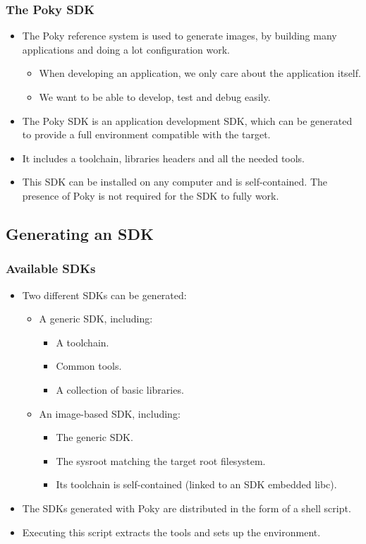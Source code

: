 \begin{frame}
  \frametitle{The Poky SDK}
  \begin{itemize}
    \item The Poky reference system is used to generate images, by
      building many applications and doing a lot configuration work.
      \begin{itemize}
        \item When developing an application, we only care about the
          application itself.
        \item We want to be able to develop, test and debug easily.
      \end{itemize}
    \item The Poky SDK is an application development SDK, which can be
      generated to provide a full environment compatible with the
      target.
    \item It includes a toolchain, libraries headers and all the
      needed tools.
    \item This SDK can be installed on any computer and is
      self-contained. The presence of Poky is not required for the SDK
      to fully work.
  \end{itemize}
\end{frame}

\subsection{Generating an SDK}

\begin{frame}
  \frametitle{Available SDKs}
  \begin{itemize}
    \item Two different SDKs can be generated:
      \begin{itemize}
        \item A generic SDK, including:
          \begin{itemize}
            \item A toolchain.
            \item Common tools.
            \item A collection of basic libraries.
          \end{itemize}
        \item An image-based SDK, including:
          \begin{itemize}
            \item The generic SDK.
            \item The sysroot matching the target root filesystem.
            \item Its toolchain is self-contained (linked to an
              SDK embedded libc).
          \end{itemize}
      \end{itemize}
    \item The SDKs generated with Poky are distributed in the form of a
      shell script.
    \item Executing this script extracts the tools and sets up the
      environment.
  \end{itemize}
\end{frame}

